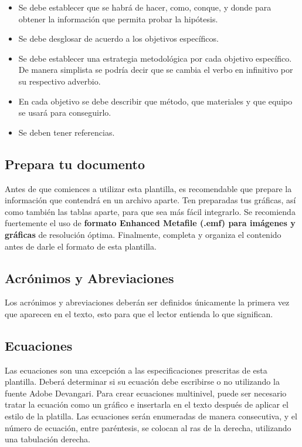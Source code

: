     \begin{itemize}
        \item Se debe establecer que se habrá de hacer, como, conque, y donde para obtener la información que permita probar la hipótesis.  
        \item Se debe desglosar de acuerdo a los objetivos específicos. 
        \item Se debe establecer una estrategia metodológica por cada objetivo específico. De manera simplista se podría decir que se cambia el verbo en infinitivo por su respectivo adverbio.
        \item En cada objetivo se debe describir que método, que materiales y que equipo se usará para conseguirlo.
        \item Se deben tener referencias.
    \end{itemize}
    \subsection{Prepara tu documento}
    
    Antes de que comiences a utilizar esta plantilla, es recomendable que prepare la información que contendrá en un archivo aparte. 
    Ten preparadas tus gráficas, así como también las tablas aparte, para que sea más fácil integrarlo. 
    Se recomienda fuertemente el uso de \textbf{formato Enhanced Metafile (.emf) para imágenes y gráficas} de resolución óptima. 
    Finalmente, completa y organiza el contenido antes de darle el formato de esta plantilla. 
    
    \subsection{Acrónimos y Abreviaciones}
    
    Los acrónimos y abreviaciones deberán ser definidos únicamente la primera vez que aparecen en el texto, esto para que el lector entienda lo que significan.
    
    \subsection{Ecuaciones}
    
    Las ecuaciones son una excepción a las especificaciones prescritas de esta plantilla. 
    Deberá determinar si su ecuación debe escribirse o no utilizando la fuente Adobe Devangari. 
    Para crear ecuaciones multinivel, puede ser necesario tratar la ecuación como un gráfico e insertarla en el texto después de aplicar el estilo de la platilla.
    Las ecuaciones serán enumeradas de manera consecutiva, y el número de ecuación, entre paréntesis, se colocan al ras de la derecha, utilizando una tabulación derecha. 
    
